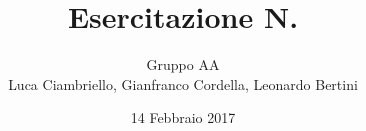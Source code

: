 \documentclass[a4paper,11pt]{article}
\author{Gruppo AA \\ Luca Ciambriello, Gianfranco Cordella, Leonardo Bertini}
\title{Esercitazione N.  }
\date{14 Febbraio 2017}
\newcommand{\insertpart}[2]{}
\begin{document}
\maketitle

\insertpart{parte1}{} 
\insertpart{parte2}{}
\insertpart{immagini}{}
\end{document}
